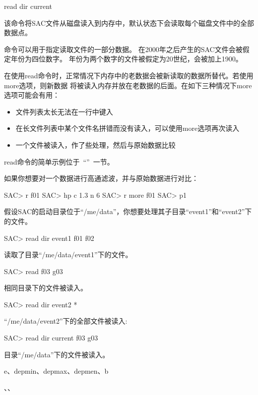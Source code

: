 \begin{SACDFT}
read dir current
\end{SACDFT}

该命令将SAC文件从磁盘读入到内存中，默认状态下会读取每个磁盘文件中的全部数据点。

命令可以用于指定读取文件的一部分数据。
在2000年之后产生的SAC文件会被假定年份为四位数字。
年份为两个数字的文件被假定为20世纪，会被加上1900。

在使用read命令时，正常情况下内存中的老数据会被新读取的数据所替代。若使用more选项，则新数据
将被读入内存并放在老数据的后面。在如下三种情况下more选项可能会有用：
\begin{itemize}
\item 文件列表太长无法在一行中键入
\item 在长文件列表中某个文件名拼错而没有读入，可以使用more选项再次读入
\item 一个文件被读入，作了些处理，然后与原始数据比较
\end{itemize}

read命令的简单示例位于~``''~一节。

如果你想要对一个数据进行高通滤波，并与原始数据进行对比：
\begin{SACCode}
SAC> r f01
SAC> hp c 1.3 n 6
SAC> r more f01
SAC> p1
\end{SACCode}

假设SAC的启动目录位于``/me/data''，你想要处理其子目录``event1''和``event2''下的文件。
\begin{SACCode}
SAC> read dir event1 f01 f02
\end{SACCode}
读取了目录``/me/data/event1''下的文件。

\begin{SACCode}
SAC> read f03 g03
\end{SACCode}
相同目录下的文件被读入。

\begin{SACCode}
SAC> read dir event2 *
\end{SACCode}
``/me/data/event2''下的全部文件被读入:

\begin{SACCode}
SAC> read dir current f03 g03
\end{SACCode}
目录``/me/data''下的文件被读入。

e、depmin、depmax、depmen、b

、、
